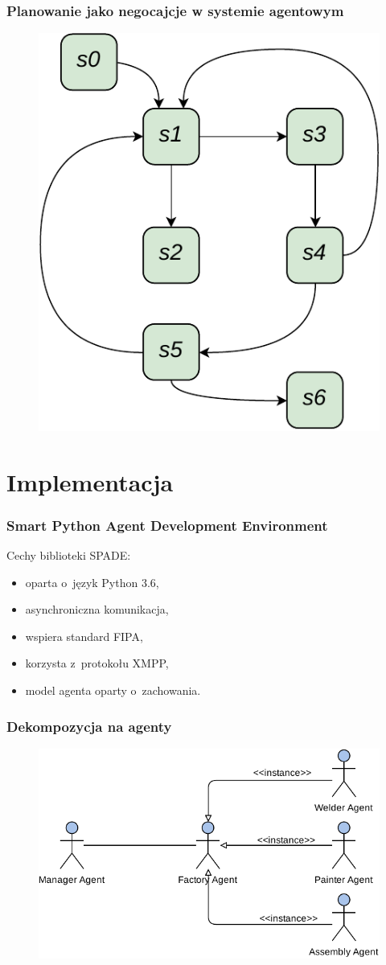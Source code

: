 \documentclass{beamer}
\begin{document}
\begin{frame}
    \frametitle{Planowanie jako negocajcje w systemie agentowym}
    \begin{figure}
        \centering
        \includegraphics[width=0.5\columnwidth]{figures/SAG-Negotiation.pdf}
        \label{fig:negocjacje}
    \end{figure}
\end{frame}

\section{Implementacja}
\begin{frame}
    \frametitle{Smart Python Agent Development Environment}
    Cechy biblioteki SPADE:
    \begin{itemize}
        \item oparta o~język Python 3.6,
        \item asynchroniczna komunikacja,
        \item wspiera standard FIPA,
        \item korzysta z~protokołu XMPP,
        \item model agenta oparty o~zachowania.
    \end{itemize}
\end{frame}

\begin{frame}
    \frametitle{Dekompozycja na agenty}
    \begin{figure}
        \centering
        \includegraphics[width=0.95\columnwidth]{figures/SAG-Agents.pdf}
        \label{fig:agenci}
    \end{figure}
\end{frame}
\end{document}
